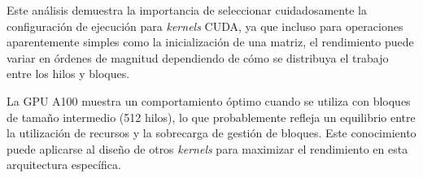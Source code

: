         Este análisis demuestra la importancia de seleccionar cuidadosamente la configuración de ejecución para \textit{kernels} CUDA, ya que incluso para operaciones aparentemente simples como la inicialización de una matriz, el rendimiento puede variar en órdenes de magnitud dependiendo de cómo se distribuya el trabajo entre los hilos y bloques.
        
        La GPU A100 muestra un comportamiento óptimo cuando se utiliza con bloques de tamaño intermedio (512 hilos), lo que probablemente refleja un equilibrio entre la utilización de recursos y la sobrecarga de gestión de bloques. Este conocimiento puede aplicarse al diseño de otros \textit{kernels} para maximizar el rendimiento en esta arquitectura específica.
